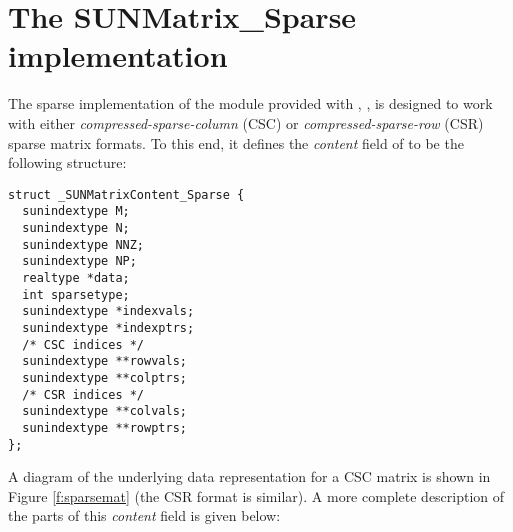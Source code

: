 \section{The SUNMatrix\_Sparse implementation}\label{ss:sunmat_sparse}

The sparse implementation of the {\sunmatrix} module provided with
{\sundials}, {\sunmatsparse}, is designed to work with either
\emph{compressed-sparse-column} (CSC) or \emph{compressed-sparse-row}
(CSR) sparse matrix formats.  To this end, it defines the {\em
content} field of  to be the following structure:
\begin{verbatim} 
struct _SUNMatrixContent_Sparse {
  sunindextype M;
  sunindextype N;
  sunindextype NNZ;
  sunindextype NP;
  realtype *data;
  int sparsetype;
  sunindextype *indexvals;
  sunindextype *indexptrs;
  /* CSC indices */
  sunindextype **rowvals;
  sunindextype **colptrs;
  /* CSR indices */
  sunindextype **colvals;
  sunindextype **rowptrs;
};
\end{verbatim}
A diagram of the underlying data representation for a
CSC matrix is shown in Figure \ref{f:sparsemat} (the CSR format is
similar).  A more complete description of the parts of
this \emph{content} field is given below: 
